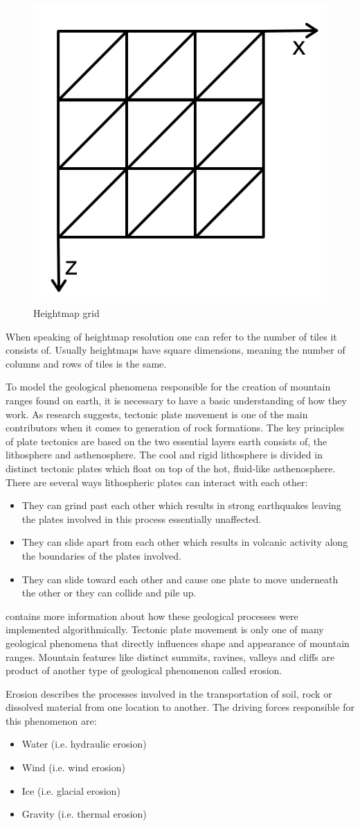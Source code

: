 \documentclass[11pt,a4paper,twoside,openright]{report}
\begin{document}
\begin{figure}[h]
\centering
\includegraphics[width=0.25\linewidth]{heightmapgrid.png}
\caption{Heightmap grid}\label{fig:heightmapgrid}
\end{figure}

When speaking of heightmap resolution one can refer to the number of tiles it consists of. Usually heightmaps have square dimensions, meaning the number of columns and rows of tiles is the same.

To model the geological phenomena responsible for the creation of mountain ranges found on earth, it is necessary to have a basic understanding of how they work. As research suggests, tectonic plate movement is one of the main contributors when it comes to generation of rock formations. The key principles of plate tectonics are based on the two essential layers earth consists of, the lithosphere and asthenosphere. The cool and rigid lithosphere is divided in distinct tectonic plates which float on top of the hot, fluid-like asthenosphere. There are several ways lithospheric plates can interact with each other:
\begin{itemize}
  \item They can grind past each other which results in strong earthquakes leaving the plates involved in this process essentially unaffected.
  \item They can slide apart from each other which results in volcanic activity along the  boundaries of the plates involved.
  \item They can slide toward each other and cause one plate to move underneath the other or they can collide and pile up.
\end{itemize}
 contains more information about how these geological processes were implemented algorithmically.
Tectonic plate movement is only one of many geological phenomena that directly influences shape and appearance of mountain ranges. Mountain features like distinct summits, ravines, valleys and cliffs are product of another type of geological phenomenon called erosion.

Erosion describes the processes involved in the transportation of soil, rock or dissolved material from one location to another. The driving forces responsible for this phenomenon are:
\begin{itemize}
  \item Water (i.e. hydraulic erosion)
  \item Wind (i.e. wind erosion)
  \item Ice (i.e. glacial erosion)
  \item Gravity (i.e. thermal erosion)
\end{itemize}
\end{document}

